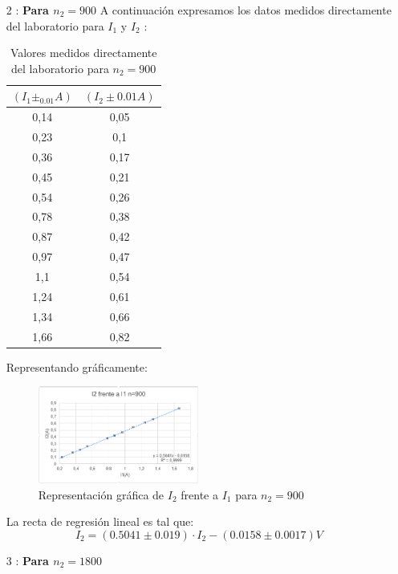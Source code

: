 \documentclass[11pt,letterpaper,twocolumn]{article}
\begin{document}
\begin{itemize}
			\item[2]: \textbf{Para $n_2=900$} 
				A continuación expresamos los datos medidos directamente del laboratorio para $I_1$ y $I_2$ :
				\begin{table}[H]
					\centering
					\caption{Valores medidos directamente del laboratorio para $n_2=900$}
					\begin{tabular}{|c|c|}
						\hline
						$\left( I_1\pm_0.01 A \right) $ & $\left( I_2 \pm 0.01 A \right) $ \\ \hline
						0,14 & 0,05 \\ 
						0,23 & 0,1 \\ 
						0,36 & 0,17 \\
						0,45 & 0,21 \\
						0,54 & 0,26 \\
						0,78 & 0,38 \\
						0,87 & 0,42 \\
						0,97 & 0,47 \\
						1,1 & 0,54 \\ 
						1,24 & 0,61 \\
						1,34 & 0,66 \\
						1,66 & 0,82 \\ \hline
					\end{tabular}
					\label{}
				\end{table}
		Representando gráficamente:
		\begin{figure}[H]
			\centering
			\includegraphics[width=0.5\textwidth]{In=900.png}
			\caption{Representación gráfica de $I_2$ frente a $I_1$ para $n_2=900$}
			\label{fig:In-900-png}
		\end{figure}
	La recta de regresión lineal es tal que:
	\begin{equation}
	\boxed{I_2={\left( 0.5041 \pm 0.019 \right) \cdot I_2 - \left( 0.0158 \pm 0.0017 \right)}V }
	\end{equation}


			\item[3]: \textbf{Para $n_2=1800$} \\ 


\end{itemize}
\end{document}
